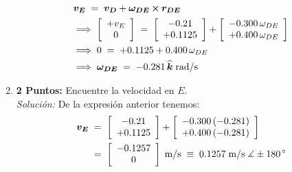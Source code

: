 \documentclass[ a4paper, twoside, 11pt]{article}
\begin{document}
\begin{problem}
\begin{enumerate}[label=\textbf{\alph*)}]
\begin{align*}
& {\boldsymbol{v_E}} \; = \; {\boldsymbol{v_D}} + {\boldsymbol{\omega_{DE}}} \,{\boldsymbol{\times}}\, {\boldsymbol{r_{DE}}} \\
& \Longrightarrow \; \left[ \begin{array}{c} +v_E \\ 0 \end{array} \right] \; = \; 
\left[ \begin{array}{c} -0.21 \\ +0.1125 \end{array} \right] +
\left[ \begin{array}{c}  -0.300 \, \omega_{DE} \\  +0.400 \, \omega_{DE} \end{array} \right] \\
& \Longrightarrow \;
0 \; = \; +0.1125 + 0.400 \, \omega_{DE} \\
& \Longrightarrow \;
{\boldsymbol{\omega_{DE}}} \; = \; -0.281 \, {\boldsymbol{\widehat{k}}} \; \text{rad/s}
\end{align*}
\item \textbf{2 Puntos:} Encuentre la velocidad en $E$. \\[1ex] \emph{Soluci\'on:} De la expresi\'on anterior tenemos: 
\begin{align*}
{\boldsymbol{v_E}} \;
& = \; \left[ \begin{array}{c} -0.21 \\ +0.1125 \end{array} \right] +
\left[ \begin{array}{c}  -0.300 \, (-0.281) \\  +0.400 \, (-0.281) \end{array} \right] \\
& = \; \left[ \begin{array}{c} -0.1257 \\ 0 \end{array} \right] \; \text{m/s} \; \equiv \;
0.1257 \; \text{m/s} \; \measuredangle \pm180^{\,\circ}
\end{align*}
\end{enumerate}

\end{problem}
\fullskip
\end{document}
